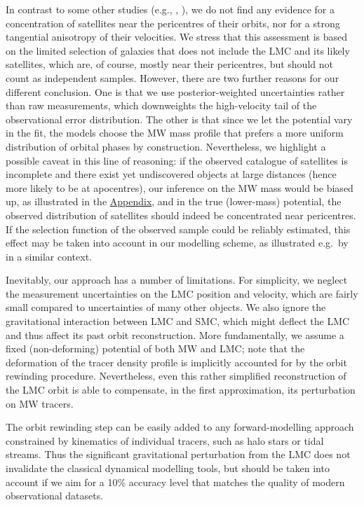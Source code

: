 \documentclass[usenatbib,fleqn]{mnras}
\begin{document}
In contrast to some other studies (e.g., \citealt{Fritz2018}, \citealt{Li2021}), we do not find any evidence for a concentration of satellites near the pericentres of their orbits, nor for a strong tangential anisotropy of their velocities. We stress that this assessment is based on the limited selection of galaxies that does not include the LMC and its likely satellites, which are, of course, mostly near their pericentres, but should not count as independent samples. However, there are two further reasons for our different conclusion. One is that we use posterior-weighted uncertainties rather than raw measurements, which downweights the high-velocity tail of the observational error distribution. The other is that since we let the potential vary in the fit, the models choose the MW mass profile that prefers a more uniform distribution of orbital phases by construction. Nevertheless, we highlight a possible caveat in this line of reasoning: if the observed catalogue of satellites is incomplete and there exist yet undiscovered objects at large distances (hence more likely to be at apocentres), our inference on the MW mass would be biased up, as illustrated in the \hyperref[sec:potential_bias]{Appendix}, and in the true (lower-mass) potential, the observed distribution of satellites should indeed be concentrated near pericentres. If the selection function of the observed sample could be reliably estimated, this effect may be taken into account in our modelling scheme, as illustrated e.g.\ by \citet{Hattori2021} in a similar context.

Inevitably, our approach has a number of limitations. For simplicity, we neglect the measurement uncertainties on the LMC position and velocity, which are fairly small compared to uncertainties of many other objects. We also ignore the gravitational interaction between LMC and SMC, which might deflect the LMC and thus affect its past orbit reconstruction. More fundamentally, we assume a fixed (non-deforming) potential of both MW and LMC; note that the deformation of the tracer density profile is implicitly accounted for by the orbit rewinding procedure. Nevertheless, even this rather simplified reconstruction of the LMC orbit is able to compensate, in the first approximation, its perturbation on MW tracers.

The orbit rewinding step can be easily added to any forward-modelling approach constrained by kinematics of individual tracers, such as halo stars or tidal streams. Thus the significant gravitational perturbation from the LMC does not invalidate the classical dynamical modelling tools, but should be taken into account if we aim for a 10\% accuracy level that matches the quality of modern observational datasets.
\end{document}
